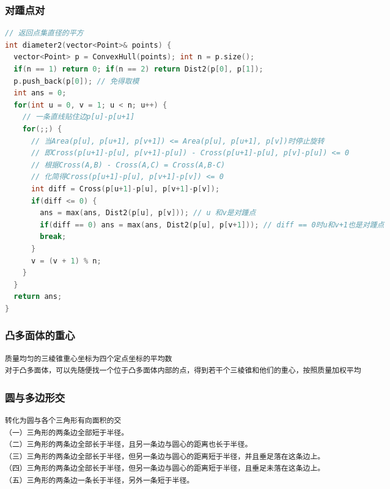 \documentclass[landscape,a4paper]{article}
\begin{document}
\begin{spacing}{0.3}
\begin{multicols}{2}
\subsubsection{对踵点对}
\begin{lstlisting}[language=C++]
// 返回点集直径的平方
int diameter2(vector<Point>& points) {
  vector<Point> p = ConvexHull(points); int n = p.size();
  if(n == 1) return 0; if(n == 2) return Dist2(p[0], p[1]);
  p.push_back(p[0]); // 免得取模
  int ans = 0;
  for(int u = 0, v = 1; u < n; u++) {
    // 一条直线贴住边p[u]-p[u+1]
    for(;;) {
      // 当Area(p[u], p[u+1], p[v+1]) <= Area(p[u], p[u+1], p[v])时停止旋转
      // 即Cross(p[u+1]-p[u], p[v+1]-p[u]) - Cross(p[u+1]-p[u], p[v]-p[u]) <= 0
      // 根据Cross(A,B) - Cross(A,C) = Cross(A,B-C)
      // 化简得Cross(p[u+1]-p[u], p[v+1]-p[v]) <= 0
      int diff = Cross(p[u+1]-p[u], p[v+1]-p[v]);
      if(diff <= 0) {
        ans = max(ans, Dist2(p[u], p[v])); // u 和v是对踵点
        if(diff == 0) ans = max(ans, Dist2(p[u], p[v+1])); // diff == 0时u和v+1也是对踵点
        break;
      }
      v = (v + 1) % n;
    }
  }
  return ans;
}
\end{lstlisting}
\subsubsection{凸多面体的重心}
\begin{lstlisting}[language=C++]
质量均匀的三棱锥重心坐标为四个定点坐标的平均数
对于凸多面体，可以先随便找一个位于凸多面体内部的点，得到若干个三棱锥和他们的重心，按照质量加权平均
\end{lstlisting}
\subsubsection{圆与多边形交}
\begin{lstlisting}[language=C++]
转化为圆与各个三角形有向面积的交
（一）三角形的两条边全部短于半径。
（二）三角形的两条边全部长于半径，且另一条边与圆心的距离也长于半径。
（三）三角形的两条边全部长于半径，但另一条边与圆心的距离短于半径，并且垂足落在这条边上。
（四）三角形的两条边全部长于半径，但另一条边与圆心的距离短于半径，且垂足未落在这条边上。
（五）三角形的两条边一条长于半径，另外一条短于半径。
\end{lstlisting}

\end{multicols}
\end{spacing}
\end{document}
